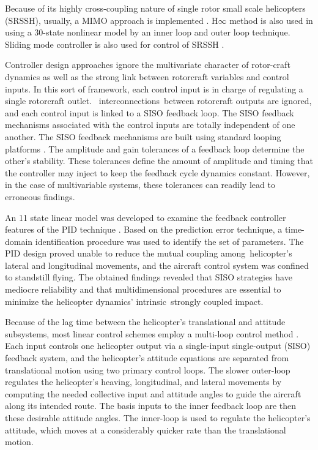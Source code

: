 Because of its highly cross-coupling nature of single rotor small scale helicopters (SRSSH), usually, a MIMO approach is implemented \cite{koo1998output, mahony1999hover}. H$\infty$ method is also used in \cite{la2003integrated,civita2006design} using a 30-state nonlinear model by an inner loop and outer loop technique. Sliding mode controller is also used for control of SRSSH \cite{khaligh2014control}. 

Controller design approaches ignore the multivariate character of rotor-craft dynamics as well as the strong link between rotorcraft variables and control inputs. In this sort of framework, each control input is in charge of regulating a single rotorcraft outlet.  interconnections between rotorcraft outputs are ignored, and each control input is linked to a SISO feedback loop. The SISO feedback mechanisms associated with the control inputs are totally independent of one another. The SISO feedback mechanisms are built using standard looping platforms \cite{walker1996advanced}. The amplitude and gain tolerances of a feedback loop determine the other's stability. These tolerances define the amount of amplitude and timing that the controller may inject to keep the feedback cycle dynamics constant. However, in the case of multivariable systems, these tolerances can readily lead to erroneous findings. 

An 11 state linear model was developed to examine the feedback controller features of the PID technique \cite{mettler1999system}. Based on the prediction error technique, a time-domain identification procedure was used to identify the set of parameters. The PID design proved unable to reduce the mutual coupling among helicopter's lateral and longitudinal movements, and the aircraft control system was confined to standstill flying. The obtained findings revealed that SISO strategies have mediocre reliability and that multidimensional procedures are essential to minimize the helicopter dynamics' intrinsic strongly coupled impact. 

Because of the lag time between the helicopter's translational and attitude subsystems, most linear control schemes employ a multi-loop control method \cite{kim2003flight, johnson2005adaptive, marconi2007robust}. Each input controls one helicopter output via a single-input single-output (SISO) feedback system, and the helicopter's attitude equations are separated from translational motion using two primary control loops. The slower outer-loop regulates the helicopter's heaving, longitudinal, and lateral movements by computing the needed collective input and attitude angles to guide the aircraft along its intended route. The basis inputs to the inner feedback loop are then these desirable attitude angles. The inner-loop is used to regulate the helicopter's attitude, which moves at a considerably quicker rate than the translational motion. 


